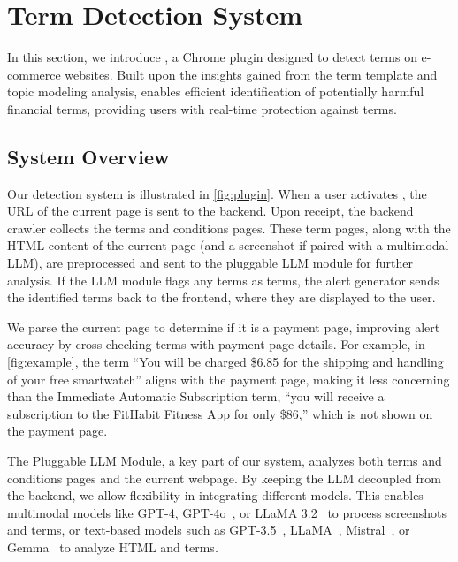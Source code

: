 \section{\TermName Term Detection System}
\label{sec:detection_section}




In this section, we introduce \platform, a Chrome plugin designed to detect \termname terms on e-commerce websites. Built upon the insights gained from the \termname term template and topic modeling analysis, \platform enables efficient identification of potentially harmful financial terms, providing users with real-time protection against \termname terms.


\subsection{System Overview}



Our detection system is illustrated in \autoref{fig:plugin}. When a user activates \platform, the URL of the current page is sent to the backend. Upon receipt, the backend crawler collects the terms and conditions pages. These term pages, along with the HTML content of the current page (and a screenshot if paired with a multimodal LLM), are preprocessed and sent to the pluggable LLM module for further analysis. If the LLM module flags any terms as \termname terms, the alert generator sends the identified terms back to the frontend, where they are displayed to the user.








We parse the current page to determine if it is a payment page, improving alert accuracy by cross-checking terms with payment page details. For example, in \autoref{fig:example}, the term ``You will be charged \$6.85 for the shipping and handling of your free smartwatch'' aligns with the payment page, making it less concerning than the Immediate Automatic Subscription term, ``you will receive a subscription to the FitHabit Fitness App for only \$86,'' which is not shown on the payment page.

The Pluggable LLM Module, a key part of our system, analyzes both terms and conditions pages and the current webpage. By keeping the LLM decoupled from the backend, we allow flexibility in integrating different models. This enables multimodal models like GPT-4, GPT-4o~\citep{openai2023gpt4}, or LLaMA 3.2~\citep{llama3.2-90B-vision} to process screenshots and terms, or text-based models such as GPT-3.5~\citep{gpt35}, LLaMA~\citep{touvron2023llama}, Mistral~\citep{jiang2023mistral}, or Gemma~\citep{team2024gemma} to analyze HTML and terms.


